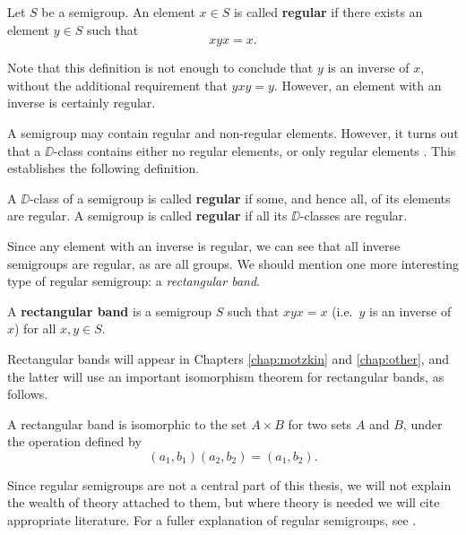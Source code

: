 \begin{definition}
  \label{def:regular-element}
  Let $S$ be a semigroup.  An element $x \in S$ is called \textbf{regular} if
  there exists an element $y \in S$ such that
  $$xyx = x.$$
\end{definition}

Note that this definition is not enough to conclude that $y$ is an inverse of
$x$, without the additional requirement that $yxy = y$.  However, an element
with an inverse is certainly regular.

A semigroup may contain regular and non-regular elements.  However, it turns out
that a $\DD$-class contains either no regular elements, or only regular elements
\cite[Proposition 2.3.1]{howie}.  This establishes the following definition.

\begin{definition}
  \label{def:regular-semigroup}
  A $\DD$-class of a semigroup is called \textbf{regular} if some, and hence
  all, of its elements are regular.  A semigroup is called \textbf{regular} if
  all its $\DD$-classes are regular.
\end{definition}

Since any element with an inverse is regular, we can see that all inverse
semigroups are regular, as are all groups.  We should mention one more
interesting type of regular semigroup: a \textit{rectangular band}.

\begin{definition}
  \label{def:rectangular-band}
  A \textbf{rectangular band} is a semigroup $S$ such that $xyx=x$ (i.e.~$y$ is
  an inverse of $x$) for all $x,y \in S$.
\end{definition}

Rectangular bands will appear in Chapters \ref{chap:motzkin} and
\ref{chap:other}, and the latter will use an important isomorphism theorem for
rectangular bands, as follows.

\begin{theorem}
  \label{thm:rectangular-band}
  A rectangular band is isomorphic to the set $A \times B$ for two sets $A$ and
  $B$, under the operation defined by
  $$(a_1, b_1) (a_2, b_2) = (a_1, b_2).$$
\end{theorem}

Since regular semigroups are not a central part of this thesis,
we will not explain the wealth of theory attached to them, but where theory is
needed we will cite appropriate literature.  For a fuller explanation of regular
semigroups, see \cite[\S2.4]{howie}.


